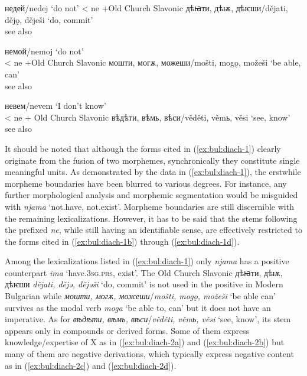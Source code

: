 \documentclass[output=paper,colorlinks=true, citecolor=brown]{langscibook}
\begin{document}
    \ex недей/nedej `do not' < ne +Old Church Slavonic дѣꙗти, дѣѭ, дѣѥши/dějati, dějǫ, děješi `do, commit' \\ \label{ex:bul:diach-1b} \href{https://ibl.bas.bg/lib/ber_4_000-1004/#page/597/mode/1up}{\citet[v.4:597]{GeorgievIlčev1971}} see also \citealt{OldChurchSlavonicOnline2020}
     
    \ex немой/nemoj `do not' \\ < ne +Old Church Slavonic  мошти, могѫ, можеши/mošti, mogǫ, možeši `be able, can' \\ \label{ex:bul:diach-1c} \href{https://ibl.bas.bg/lib/ber_4_000-1004/#page/610/mode/1up}{\citet[v.4:610]{GeorgievIlčev1971}} see also \citealt{OldChurchSlavonicOnline2020}
    
    \ex невем/nevem `I don't know' \\ < ne + Old Church Slavonic  вѣдѣти, вѣмь, вѣси/věděti, věmь, věsi `see, know' \\ \label{ex:bul:diach-1d} \href{https://ibl.bas.bg/lib/ber_4_000-1004/#page/585/mode/1up}{\citet[v.4:585]{GeorgievIlčev1971}} see also \citealt{OldChurchSlavonicOnline2020}
    \z 
\z

It should be noted that although the forms cited in (\ref{ex:bul:diach-1}) clearly originate from the fusion of two morphemes, synchronically they constitute single meaningful units. As demonstrated by the data in (\ref{ex:bul:diach-1}), the erstwhile morpheme boundaries have been blurred to various degrees. For instance, any further morphological analysis and morphemic segmentation would be misguided with \textit{njama} `not.have, not.exist'. Morpheme boundaries are still discernible with the remaining lexicalizations. However, it has to be said that the stems following the prefixed \textit{ne}, while still having an identifiable sense, are effectively restricted to the forms cited in (\ref{ex:bul:diach-1b}) through (\ref{ex:bul:diach-1d}).

Among the lexicalizations listed in (\ref{ex:bul:diach-1}) only \textit{njama} has a positive counterpart \textit{ima} `have.\textsc{3sg.prs}, exist'. The Old Church Slavonic дѣꙗти, дѣѭ, дѣѥши \textit{dějati, dějə, dějəši} `do, commit' is not used in the positive in Modern Bulgarian while \textit{мошти, могѫ, можеши}/\textit{mošti, mogǫ, možeši} `be able can' survives as the modal verb \textit{moga} `be able to, can' but it does not have an imperative. As for \textit{вѣдѣти, вѣмь, вѣси}/\textit{věděti, věmь, věsi} `see, know', its stem appears only in compounds or derived forms. Some of them express knowledge/expertise of X as in (\ref{ex:bul:diach-2a}) and (\ref{ex:bul:diach-2b}) but many of them are negative derivations, which typically express negative content as in (\ref{ex:bul:diach-2c}) and (\ref{ex:bul:diach-2d}).
\end{document}
